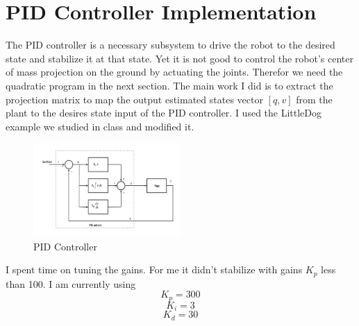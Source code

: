 \documentclass[conference]{IEEEtran}
\begin{document}
\section{PID Controller Implementation}
The PID controller is a necessary subsystem to drive the robot to the desired state and stabilize it at that state. 
Yet it is not good to control the robot's center of mass projection on the ground by actuating the joints. 
Therefor we need the quadratic program in the next section. 
The main work I did is to extract the projection matrix to map the output estimated states vector $[q, v]$ from the plant to the desires 
state input of the PID controller. I used the LittleDog example we studied in class and modified it.
\begin{figure}
    \includegraphics[width=0.5\textwidth]{figures/PID.png}
    \caption{PID Controller}
    \label{fig:PidController}
\end{figure}
I spent time on tuning the gains. For me it didn't stabilize with gains $K_p$ less than 100. I am currently using
$$K_p = 300$$
$$K_i = 3$$
$$K_d = 30$$
\end{document}
